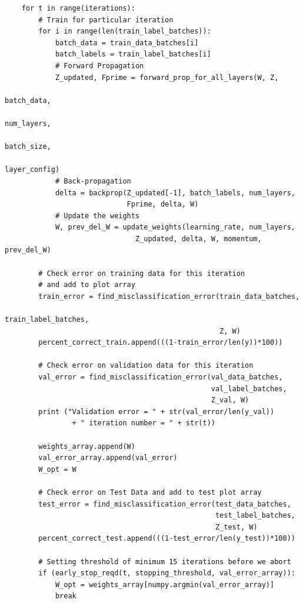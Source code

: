 \documentclass{article}
\begin{document}
\begin{lstlisting}
    for t in range(iterations):
        # Train for particular iteration
        for i in range(len(train_label_batches)):
            batch_data = train_data_batches[i]
            batch_labels = train_label_batches[i]
            # Forward Propagation   
            Z_updated, Fprime = forward_prop_for_all_layers(W, Z,
                                                             batch_data, 
                                                             num_layers, 
                                                             batch_size, 
                                                             layer_config)
            # Back-propagation                                                 
            delta = backprop(Z_updated[-1], batch_labels, num_layers,
                             Fprime, delta, W)
            # Update the weights
            W, prev_del_W = update_weights(learning_rate, num_layers,
                               Z_updated, delta, W, momentum, prev_del_W)
                
        # Check error on training data for this iteration 
        # and add to plot array
        train_error = find_misclassification_error(train_data_batches,
                                                   train_label_batches,
                                                   Z, W)
        percent_correct_train.append(((1-train_error/len(y))*100))
        
        # Check error on validation data for this iteration
        val_error = find_misclassification_error(val_data_batches, 
                                                 val_label_batches,
                                                 Z_val, W)
        print ("Validation error = " + str(val_error/len(y_val)) 
                + " iteration number = " + str(t))

        weights_array.append(W)
        val_error_array.append(val_error)
        W_opt = W

        # Check error on Test Data and add to test plot array
        test_error = find_misclassification_error(test_data_batches, 
                                                  test_label_batches, 
                                                  Z_test, W)
        percent_correct_test.append(((1-test_error/len(y_test))*100))
        
        # Setting threshold of minimum 15 iterations before we abort
        if (early_stop_reqd(t, stopping_threshold, val_error_array)):
            W_opt = weights_array[numpy.argmin(val_error_array)] 
            break
        

\end{lstlisting}
\end{document}
